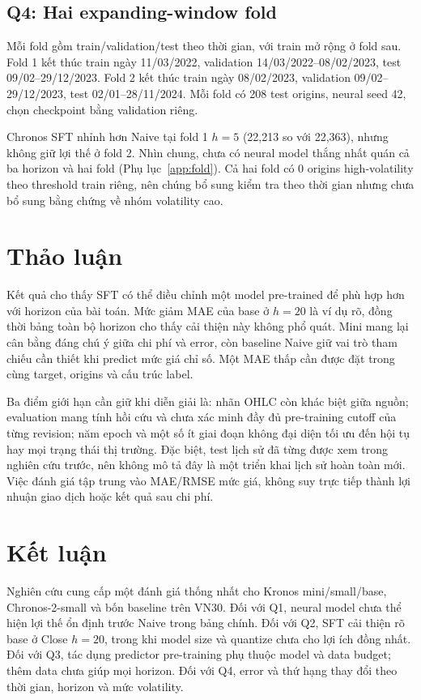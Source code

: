 \documentclass[11pt,a4paper]{article}
\begin{document}
\subsection{Q4: Hai expanding-window fold}
Mỗi fold gồm train/validation/test theo thời gian, với train mở rộng ở
fold sau. Fold 1 kết thúc train ngày 11/03/2022, validation
14/03/2022--08/02/2023, test 09/02--29/12/2023. Fold 2 kết thúc train
ngày 08/02/2023, validation 09/02--29/12/2023, test
02/01--28/11/2024. Mỗi fold có 208 test origins, neural seed 42,
chọn checkpoint bằng validation riêng.

Chronos SFT nhỉnh hơn Naive tại fold 1 $h=5$ (22,213 so với 22,363),
nhưng không giữ lợi thế ở fold 2. Nhìn chung, chưa có neural model
thắng nhất quán cả ba horizon và hai fold
(Phụ lục~\ref{app:fold}). Cả hai fold có 0 origins high-volatility theo
threshold train riêng, nên chúng bổ sung kiểm tra theo thời gian nhưng
chưa bổ sung bằng chứng về nhóm volatility cao.
\FloatBarrier

\section{Thảo luận}
Kết quả cho thấy SFT có thể điều chỉnh một model pre-trained để phù hợp
hơn với horizon của bài toán. Mức giảm MAE của base ở $h=20$ là ví dụ
rõ, đồng thời bảng toàn bộ horizon cho thấy cải thiện này không phổ quát.
Mini mang lại cân bằng đáng chú ý giữa chi phí và error, còn baseline
Naive giữ vai trò tham chiếu cần thiết khi predict mức giá chỉ số.
Một MAE thấp cần được đặt trong cùng target, origins và cấu trúc label.

Ba điểm giới hạn cần giữ khi diễn giải là: nhãn OHLC còn khác biệt
giữa nguồn; evaluation mang tính hồi cứu và chưa xác minh đầy đủ
pre-training cutoff của từng revision; năm epoch và một số ít giai đoạn
không đại diện tối ưu đến hội tụ hay mọi trạng thái thị trường.
Đặc biệt, test lịch sử đã từng được xem trong nghiên cứu trước, nên
không mô tả đây là một triển khai lịch sử hoàn toàn mới.
Việc đánh giá tập trung vào MAE/RMSE mức giá, không suy trực tiếp
thành lợi nhuận giao dịch hoặc kết quả sau chi phí.

\section{Kết luận}
Nghiên cứu cung cấp một đánh giá thống nhất cho Kronos mini/small/base,
Chronos-2-small và bốn baseline trên VN30. Đối với Q1, neural model chưa
thể hiện lợi thế ổn định trước Naive trong bảng chính. Đối với Q2, SFT
cải thiện rõ base ở Close $h=20$, trong khi model size và quantize chưa
cho lợi ích đồng nhất. Đối với Q3, tác dụng predictor pre-training phụ
thuộc model và data budget; thêm data chưa giúp mọi horizon. Đối với Q4,
error và thứ hạng thay đổi theo thời gian, horizon và mức volatility.
\end{document}
